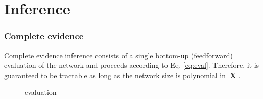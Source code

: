 \documentclass[10pt, t, xcolor={usenames,dvipsnames,svgnames}, compress]{beamer}
\begin{document}
\section{Inference}
{
  \begin{frame}[c]
    \sectionpage
  \end{frame}
}

\begin{frame}
\frametitle{Complete evidence}

Complete evidence inference consists of a single bottom-up
(feedforward) evaluation of the network and proceeds according to
Eq. \ref{eq:eval}.
%
Therefore, it is guaranteed to be tractable
as long as the network size is polynomial in $|\mathbf{X}|$.
\begin{figure}
\caption{evaluation}
\end{figure}
\end{frame}
\end{document}
